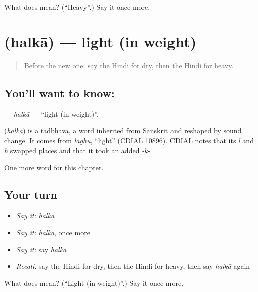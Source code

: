 \begin{tcolorbox}[breakable,colback=teal!4,colframe=teal!35!black,title={Before you move on}]
What does  mean? (\textquotedblleft{}Heavy\textquotedblright{}.) Say it once more.
\end{tcolorbox}
\section[\texorpdfstring{\hi{हल्का} (halkā)}{हल्का (halkā)}]{ (halkā) — light (in weight)}

\label{lesson:HI-C154-halka}



\begin{quote}
Before the new one: say the Hindi for dry, then the Hindi for heavy.
\end{quote}

\subsection*{You'll want to know: }
\textbf{} — \emph{halkā} — \textquotedblleft{}light (in weight)\textquotedblright{}.

\begin{cousinweb}
\textbf{} (\emph{halkā}) is a tadbhava, a word inherited from Sanskrit and reshaped by sound change. It comes from \emph{laghu}, \textquotedblleft{}light\textquotedblright{} (CDIAL 10896). CDIAL notes that its \emph{l} and \emph{h} swapped places and that it took an added \emph{-k-}.
\end{cousinweb}

\begin{grammarlens}[title={What you've built}]
One more word for this chapter.
\end{grammarlens}

\subsection*{Your turn}
\begin{itemize}
\raggedright
  \item \emph{Say it:} \emph{halkā}
  \item \emph{Say it:} \emph{halkā}, once more
  \item \emph{Say it:} say \emph{halkā}
  \item \emph{Recall:} say the Hindi for dry, then the Hindi for heavy, then say \emph{halkā} again
\end{itemize}

\begin{tcolorbox}[breakable,colback=teal!4,colframe=teal!35!black,title={Before you move on}]
What does  mean? (\textquotedblleft{}Light (in weight)\textquotedblright{}.) Say it once more.
\end{tcolorbox}
